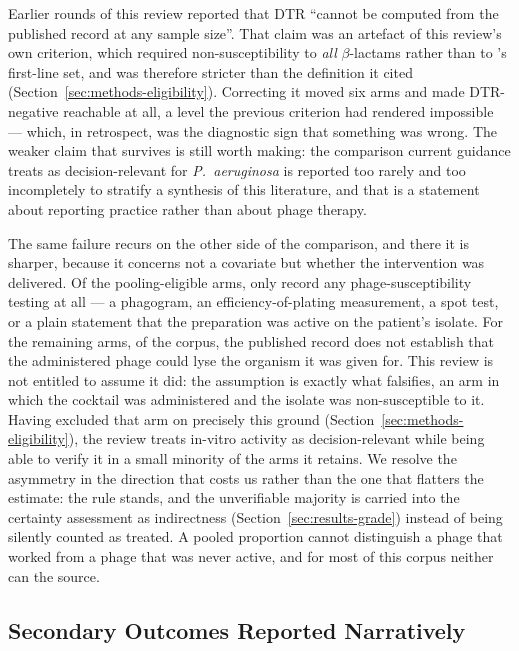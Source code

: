 Earlier rounds of this review reported that DTR ``cannot be computed from the published record at any sample size''. That claim was an artefact of this review's own criterion, which required non-susceptibility to \emph{all} $\beta$-lactams rather than to \citeauthor{Kadri2018_dtr}'s first-line set, and was therefore stricter than the definition it cited (Section~\ref{sec:methods-eligibility}). Correcting it moved six arms and made DTR-negative reachable at all, a level the previous criterion had rendered impossible --- which, in retrospect, was the diagnostic sign that something was wrong. The weaker claim that survives is still worth making: the comparison current guidance treats as decision-relevant for \textit{P.\ aeruginosa} is reported too rarely and too incompletely to stratify a synthesis of this literature, and that is a statement about reporting practice rather than about phage therapy.

The same failure recurs on the other side of the comparison, and there it is sharper, because it concerns not a covariate but whether the intervention was delivered. Of the \PhageSuscArms pooling-eligible arms, only \PhageSuscDocumented record any phage-susceptibility testing at all --- a phagogram, an efficiency-of-plating measurement, a spot test, or a plain statement that the preparation was active on the patient's isolate. For the remaining \PhageSuscSilent arms, \PhageSuscSilentPct of the corpus, the published record does not establish that the administered phage could lyse the organism it was given for. This review is not entitled to assume it did: the assumption is exactly what \textcite{Onsea2019_viruses} falsifies, an arm in which the cocktail was administered and the isolate was non-susceptible to it. Having excluded that arm on precisely this ground (Section~\ref{sec:methods-eligibility}), the review treats in-vitro activity as decision-relevant while being able to verify it in a small minority of the arms it retains. We resolve the asymmetry in the direction that costs us rather than the one that flatters the estimate: the rule stands, and the unverifiable majority is carried into the certainty assessment as indirectness (Section~\ref{sec:results-grade}) instead of being silently counted as treated. A pooled proportion cannot distinguish a phage that worked from a phage that was never active, and for most of this corpus neither can the source.

\subsection{Secondary Outcomes Reported Narratively}
\label{sec:results-secondary}

